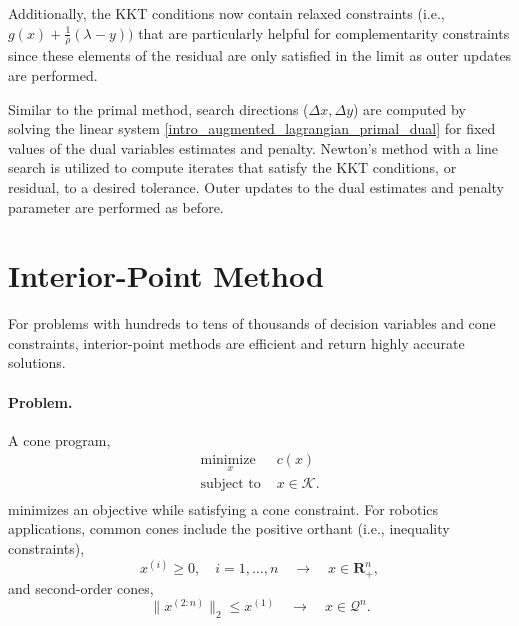 Additionally, the KKT conditions now contain relaxed constraints (i.e., $g(x) + \frac{1}{\rho}(\lambda - y))$ that are particularly helpful for complementarity constraints since these elements of the residual are only satisfied in the limit as outer updates are performed.

Similar to the primal method, search directions ($\Delta x, \Delta y$) are computed by solving the linear system \eqref{intro_augmented_lagrangian_primal_dual} for fixed values of the dual variables estimates and penalty. Newton's method with a line search is utilized to compute iterates that satisfy the KKT conditions, or residual, to a desired tolerance. Outer updates to the dual estimates and penalty parameter are performed as before.

\section{Interior-Point Method}
For problems with hundreds to tens of thousands of decision variables and cone constraints, interior-point methods are efficient and return highly accurate solutions.
\paragraph{Problem.}
A cone program,
\begin{equation}
	\begin{array}{ll}
		\underset{x}{\mbox{minimize }}  & c(x) \\
		\mbox{subject to } & x \in \mathcal{K}. \\
	\end{array}
	\label{intro_cone_program}
\end{equation}
minimizes an objective while satisfying a cone constraint. For robotics applications, common cones include the positive orthant (i.e., inequality constraints),
\begin{equation} 
	x^{(i)} \ge 0, \quad i = 1, \dots, n \quad \rightarrow \quad x \in \mathbf{R}^n_{+},
\end{equation}
and second-order cones,
\begin{equation}
	\|x^{(2:n)}\|_2 \leq x^{(1)} \quad \rightarrow \quad x \in \mathcal{Q}^n.
\end{equation}

